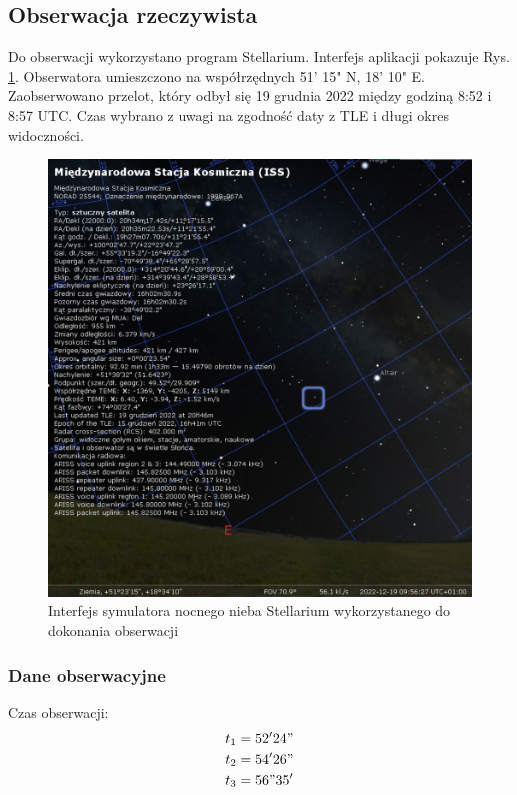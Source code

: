 \FloatBarrier
\subsection{Obserwacja rzeczywista}
 Do obserwacji wykorzystano program Stellarium. Interfejs aplikacji pokazuje Rys. \ref{fig:stellarium-interfejs}. Obserwatora umieszczono na współrzędnych 51' 15" N, 18' 10" E. Zaobserwowano przelot, który odbył się 19 grudnia 2022 między godziną 8:52 i 8:57 UTC. Czas wybrano z uwagi na zgodność daty z TLE i długi okres widoczności.
    \begin{figure}
    \centering
    \includegraphics[width=\textwidth]{tex/img/ISSStellarium.png}
    \caption{Interfejs symulatora nocnego nieba Stellarium wykorzystanego do dokonania obserwacji}
    \label{fig:stellarium-interfejs}
    \end{figure}

    \subsubsection{Dane obserwacyjne}

    Czas obserwacji: 
        \begin{align*}
            t_1 &= 52'24" \\
            t_2 &= 54'26"  \\
            t_3 &= 56"35'
        \end{align*}
        

